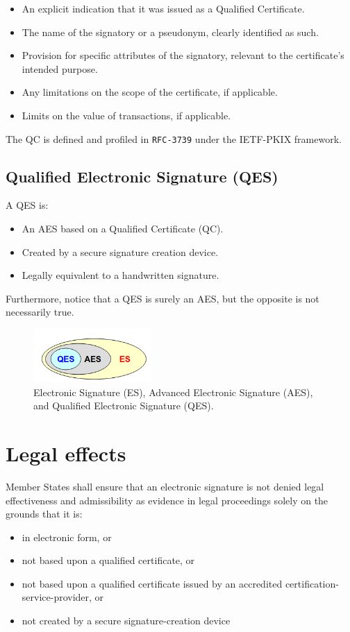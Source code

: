 \begin{itemize}
    \item An explicit indication that it was issued as a Qualified
      Certificate.
    \item The name of the signatory or a pseudonym, clearly identified
      as such.
    \item Provision for specific attributes of the signatory, relevant
      to the certificate's intended purpose.
    \item Any limitations on the scope of the certificate, if
      applicable.
    \item Limits on the value of transactions, if applicable.
\end{itemize}

The QC is defined and profiled in \texttt{RFC-3739} under the
IETF-PKIX framework.

\subsection{Qualified Electronic Signature (QES)}
A QES is:
\begin{itemize}
    \item An AES based on a Qualified Certificate (QC).
    \item Created by a secure signature creation device.
    \item Legally equivalent to a handwritten signature.
\end{itemize}

Furthermore, notice that a QES is surely an AES, but the opposite is 
not necessarily true.

\begin{figure}[H]
  \centering
  \includegraphics[width=0.4\textwidth]{img/es-aes-qus.png}
  \caption{Electronic Signature (ES), Advanced Electronic Signature
  (AES), and Qualified Electronic Signature (QES).}
\end{figure}

\section{Legal effects}
Member States shall ensure that an electronic signature is not denied
legal effectiveness and admissibility as evidence in legal proceedings
solely on the grounds that it is:
\begin{itemize}
  \item in electronic form, or
  \item not based upon a qualified certificate, or
  \item not based upon a qualified certificate issued by an accredited
    certification-service-provider, or
  \item not created by a secure signature-creation device
\end{itemize}

